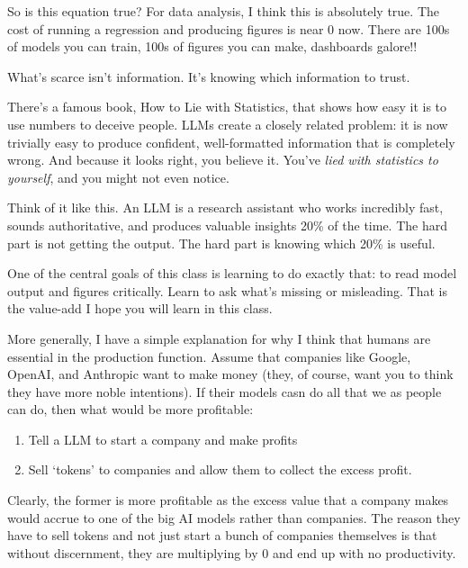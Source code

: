 \documentclass[12pt]{article}
\begin{document}
So is this equation true? 
For data analysis, I think this is absolutely true. 
The cost of running a regression and producing figures is near 0 now. 
There are 100s of models you can train, 100s of figures you can make, dashboards galore!! 

What's scarce isn't information. It's knowing which information to trust.

There's a famous book, How to Lie with Statistics, that shows how easy it is to use numbers to deceive people. 
LLMs create a closely related problem: it is now trivially easy to produce confident, well-formatted information that is completely wrong. 
And because it looks right, you believe it. 
You've \emph{lied with statistics to yourself}, and you might not even notice.

Think of it like this. 
An LLM is a research assistant who works incredibly fast, sounds authoritative, and produces valuable insights 20\% of the time. 
The hard part is not getting the output. 
The hard part is knowing which 20\% is useful.

One of the central goals of this class is learning to do exactly that: to read model output and figures critically. 
Learn to ask what's missing or misleading. 
That is the value-add I hope you will learn in this class.

More generally, I have a simple explanation for why I think that humans are essential in the production function.
Assume that companies like Google, OpenAI, and Anthropic want to make money (they, of course, want you to think they have more noble intentions). 
If their models casn do all that we as people can do, then what would be more profitable:
\begin{enumerate}
  \item Tell a LLM to start a company and make profits
  
  \item Sell `tokens' to companies and allow them to collect the excess profit. 
\end{enumerate}
Clearly, the former is more profitable as the excess value that a company makes would accrue to one of the big AI models rather than companies.
The reason they have to sell tokens and not just start a bunch of companies themselves is that without discernment, they are multiplying by 0 and end up with no productivity. 
\end{document}
